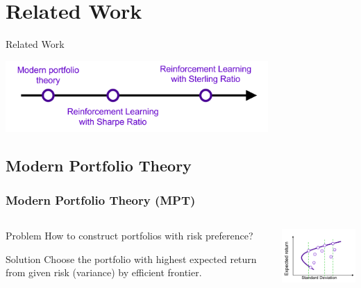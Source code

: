 \section{Related Work}

\begin{frame}{Related Work}
       \tableofcontents[sectionstyle=show/hide, hideothersubsections]
    \begin{center}
    \includegraphics[width=10cm]{images/related.png}
    \end{center}
\end{frame}

\subsection{Modern Portfolio Theory}

\begin{frame}
\frametitle{Modern Portfolio Theory (MPT)}
\begin{columns}
\begin{column}{0.55\textwidth}
\begin{block}{Problem}
    How to construct portfolios with risk preference?
\end{block}
\begin{block}{Solution}
    Choose the portfolio with highest expected return from given risk (variance) by efficient frontier.
\end{block}
\end{column}
\begin{column}{0.45\textwidth}
\begin{center}
\includegraphics[width=4.8cm]{images/mpt_risk.png}
\end{center}
\end{column}
\end{columns}
\end{frame}

